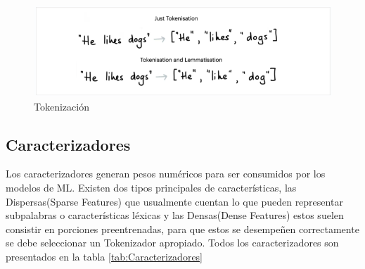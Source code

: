\begin{figure}[h]
    \centering
    \includegraphics[width=\textwidth]{imagenes/cap3/tokenization.png}   
    \caption{Tokenización}
    \label{fig:tokenization-MLU}
\end{figure}

\subsection{Caracterizadores}
 Los caracterizadores generan pesos numéricos para ser consumidos por los modelos de ML. Existen dos tipos principales de
 características, las Dispersas(Sparse Features) que usualmente cuentan lo que pueden representar subpalabras o características
 léxicas y las Densas(Dense Features) estos suelen consistir en porciones preentrenadas, para que
 estos se desempeñen correctamente se debe seleccionar un Tokenizador apropiado. \cite{warmerdam_2022}
 Todos los caracterizadores son presentados en la tabla \ref{tab:Caracterizadores}

